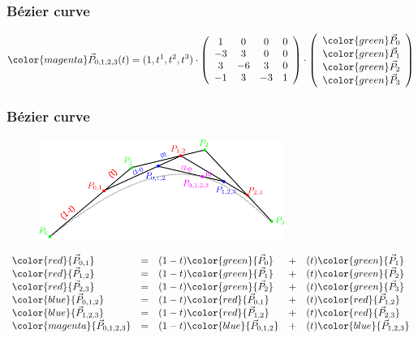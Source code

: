 \begin{frame}
\frametitle{Bézier curve}
$$
{\color{magenta}\vec{P}_{0,1,2,3}(t)}=(1,t^1,t^2,t^3)\cdot
\left(
\begin{array}{cccc}
 1 &  0 &  0 &  0 \\
-3 &  3 &  0 &  0 \\
 3 & -6 &  3 &  0 \\
-1 &  3 & -3 &  1
\end{array}
\right)
\cdot
\left(
\begin{array}{c}
  {\color{green}\vec{P}_{0}} \\
  {\color{green}\vec{P}_{1}} \\
  {\color{green}\vec{P}_{2}} \\
  {\color{green}\vec{P}_{3}} 
\end{array}
\right)
$$
\end{frame}


\begin{frame}
\frametitle{Bézier curve}
  \begin{figure}[h]
  \includegraphics[width=8cm,keepaspectratio]{pics/bezier/bezier}
  \end{figure}
  {\scriptsize
  \[
  \begin{array}{lclcl}
    \color{red}    {\vec{P}_{0,1}    } &=& (1-t)\color{green}{\vec{P}_0      } &+& (t)\color{green}{\vec{P}_1      } \\
    \color{red}    {\vec{P}_{1,2}    } &=& (1-t)\color{green}{\vec{P}_1      } &+& (t)\color{green}{\vec{P}_2      } \\
    \color{red}    {\vec{P}_{2,3}    } &=& (1-t)\color{green}{\vec{P}_2      } &+& (t)\color{green}{\vec{P}_3      } \\
    \color{blue}   {\vec{P}_{0,1,2}  } &=& (1-t)\color{red}  {\vec{P}_{0,1}  } &+& (t)\color{red}  {\vec{P}_{1,2}  } \\
    \color{blue}   {\vec{P}_{1,2,3}  } &=& (1-t)\color{red}  {\vec{P}_{1,2}  } &+& (t)\color{red}  {\vec{P}_{2,3}  } \\
    \color{magenta}{\vec{P}_{0,1,2,3}} &=& (1-t)\color{blue} {\vec{P}_{0,1,2}} &+& (t)\color{blue} {\vec{P}_{1,2,3}} 
  \end{array}
  \]
  }
\end{frame}

